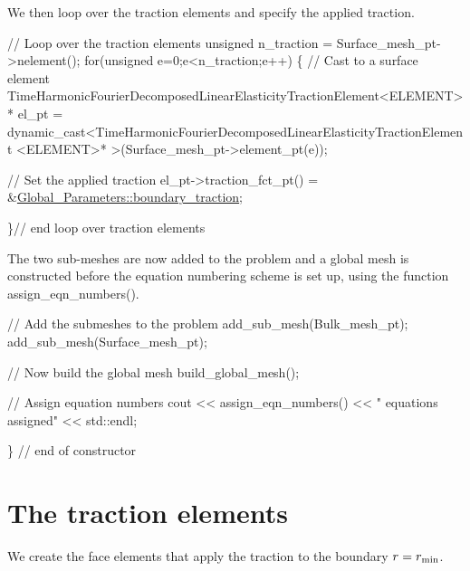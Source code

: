 We then loop over the traction elements and specify the applied traction.


\begin{DoxyCodeInclude}
 \textcolor{comment}{// Loop over the traction elements}
 \textcolor{keywordtype}{unsigned} n\_traction =  Surface\_mesh\_pt->nelement();
 \textcolor{keywordflow}{for}(\textcolor{keywordtype}{unsigned} e=0;e<n\_traction;e++)
  \{
   \textcolor{comment}{// Cast to a surface element}
   TimeHarmonicFourierDecomposedLinearElasticityTractionElement<ELEMENT>*
    el\_pt = 
    \textcolor{keyword}{dynamic\_cast<}TimeHarmonicFourierDecomposedLinearElasticityTractionElement
    <ELEMENT\textcolor{keyword}{>}* >(Surface\_mesh\_pt->element\_pt(e));
   
   \textcolor{comment}{// Set the applied traction}
   el\_pt->traction\_fct\_pt() = &\hyperlink{namespaceGlobal__Parameters_a579fa434bf9ee57e66d4bd42b208fc23}{Global\_Parameters::boundary\_traction};
   
  \}\textcolor{comment}{// end loop over traction elements}

\end{DoxyCodeInclude}


The two sub-\/meshes are now added to the problem and a global mesh is constructed before the equation numbering scheme is set up, using the function {\ttfamily assign\+\_\+eqn\+\_\+numbers()}.


\begin{DoxyCodeInclude}
 \textcolor{comment}{// Add the submeshes to the problem}
 add\_sub\_mesh(Bulk\_mesh\_pt);
 add\_sub\_mesh(Surface\_mesh\_pt);

 \textcolor{comment}{// Now build the global mesh}
 build\_global\_mesh();

 \textcolor{comment}{// Assign equation numbers}
 cout << assign\_eqn\_numbers() << \textcolor{stringliteral}{" equations assigned"} << std::endl; 

\} \textcolor{comment}{// end of constructor}

\end{DoxyCodeInclude}




 

\hypertarget{index_traction_elements}{}\section{The traction elements}\label{index_traction_elements}
We create the face elements that apply the traction to the boundary $ r=r_{\rm min} $.


